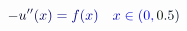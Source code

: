 \documentclass[12pt]{article}
\begin{document}
\makeatletter
\renewcommand*{\@textcolor}[3]{%
  \protect\leavevmode
  \begingroup
    \color#1{#2}#3%
  \endgroup
}
\makeatother
\begin{displaymath}
\mathcolor[RGB]{0,0,15}{-} \mathcolor[RGB]{0,0,30}{u} ^ { \mathcolor[RGB]{0,0,45}{\prime} \mathcolor[RGB]{0,0,60}{\prime} } \mathcolor[RGB]{0,0,75}{(} \mathcolor[RGB]{0,0,90}{x} \mathcolor[RGB]{0,0,105}{)} \mathcolor[RGB]{0,0,120}{=} \mathcolor[RGB]{0,0,135}{f} \mathcolor[RGB]{0,0,150}{(} \mathcolor[RGB]{0,0,165}{x} \mathcolor[RGB]{0,0,180}{)} \quad \mathcolor[RGB]{0,0,195}{x} \mathcolor[RGB]{0,0,210}{\in} \mathcolor[RGB]{0,0,225}{(} \mathcolor[RGB]{0,0,240}{0} \mathcolor[RGB]{0,0,255}{,} \mathcolor[RGB]{0,15,0}{0} \mathcolor[RGB]{0,15,15}{.} \mathcolor[RGB]{0,15,30}{5} \mathcolor[RGB]{0,15,45}{)}
\end{displaymath}
\end{document}
